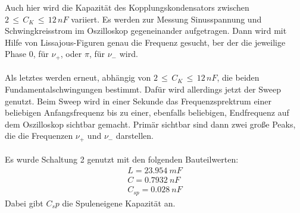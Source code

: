 \documentclass[
  bibliography=totoc,     %
  captions=tableheading,  %
  titlepage=firstiscover, %
]{scrartcl}
\begin{document}
Auch hier wird die Kapazität des Kopplungskondensators zwischen
$2\,\leq\,C_K\,\leq\,12\,nF$ variiert. Es werden zur Messung Sinusspannung
und Schwingkreisstrom im Oszilloskop gegeneinander aufgetragen. Dann wird
mit Hilfe von Lissajous-Figuren genau die Frequenz gesucht, ber der die
jeweilige Phase 0, für $\nu_+$, oder $\pi$, für $\nu_-$ wird.\\
\\
Als letztes werden erneut, abhängig von $2\,\leq\,C_K\,\leq\,12\,nF$, die beiden
Fundamentalschwingungen bestimmt. Dafür wird allerdings jetzt der Sweep genutzt.
Beim Sweep wird in einer Sekunde das Frequenzsprektrum einer beliebigen
Anfangsfrequenz bis zu einer, ebenfalls beliebigen, Endfrequenz auf dem
Oszilloskop sichtbar gemacht. Primär sichtbar sind dann zwei große Peaks,
die die Frequenzen $\nu_+$ und $\nu_-$ darstellen.\\
\\
Es wurde Schaltung 2 genutzt mit den folgenden Bauteilwerten:
\begin{align}
  L=\SI{23.954}{mF} \\
  C=\SI{0.7932}{nF} \\
  C_{sp}=\SI{0.028}{nF}
\end{align}
Dabei gibt $C_sp$ die Spuleneigene Kapazität an.
\end{document}
